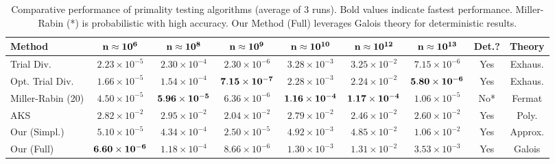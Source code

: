\begin{table}[h]
\centering
\small
\begin{tabular}{|l|c|c|c|c|c|c|c|c|}
\hline
\textbf{Method} & ${\bf n \approx 10^{6}}$ & ${\bf n \approx 10^{8}}$ & ${\bf n \approx 10^{9}}$ & ${\bf n \approx 10^{10}}$ & ${\bf n \approx 10^{12}}$ & ${\bf n \approx 10^{13}}$ & \textbf{Det.?} & \textbf{Theory} \\
\hline
Trial Div. & $2.23 \times 10^{-5}$ & $2.30 \times 10^{-4}$ & $2.30 \times 10^{-6}$ & $3.28 \times 10^{-3}$ & $3.25 \times 10^{-2}$ & $7.15 \times 10^{-6}$ & Yes & Exhaus. \\
Opt. Trial Div. & $1.66 \times 10^{-5}$ & $1.54 \times 10^{-4}$ & ${\bf 7.15 \times 10^{-7}}$ & $2.28 \times 10^{-3}$ & $2.24 \times 10^{-2}$ & ${\bf 5.80 \times 10^{-6}}$ & Yes & Exhaus. \\
Miller-Rabin (20) & $4.50 \times 10^{-5}$ & ${\bf 5.96 \times 10^{-5}}$ & $6.36 \times 10^{-6}$ & ${\bf 1.16 \times 10^{-4}}$ & ${\bf 1.17 \times 10^{-4}}$ & $1.06 \times 10^{-5}$ & No* & Fermat \\
AKS & $2.82 \times 10^{-2}$ & $2.95 \times 10^{-2}$ & $2.04 \times 10^{-2}$ & $2.79 \times 10^{-2}$ & $2.46 \times 10^{-2}$ & $2.60 \times 10^{-2}$ & Yes & Poly. \\
Our (Simpl.) & $5.10 \times 10^{-5}$ & $4.34 \times 10^{-4}$ & $2.50 \times 10^{-5}$ & $4.92 \times 10^{-3}$ & $4.85 \times 10^{-2}$ & $1.06 \times 10^{-2}$ & Yes & Approx. \\
Our (Full) & ${\bf 6.60 \times 10^{-6}}$ & $1.18 \times 10^{-4}$ & $8.66 \times 10^{-6}$ & $1.30 \times 10^{-3}$ & $1.31 \times 10^{-2}$ & $3.53 \times 10^{-3}$ & Yes & Galois \\
\hline
\end{tabular}
\caption{Comparative performance of primality testing algorithms (average of 3 runs). Bold values indicate fastest performance. Miller-Rabin (*) is probabilistic with high accuracy. Our Method (Full) leverages Galois theory for deterministic results.}
\label{tab:performance}
\end{table}